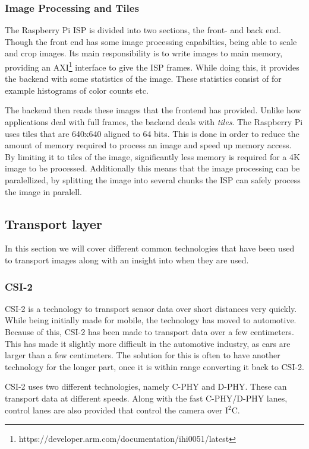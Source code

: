 \subsubsection{Image Processing and Tiles}
The Raspberry Pi ISP is divided into two sections, the front- and back end.
Though the front end has some image processing capabilties, being able to scale
and crop images. Its main responsibility is to write images to main memory,
providing an
AXI\footnote{https://developer.arm.com/documentation/ihi0051/latest} interface
to give the ISP frames. While doing this, it provides the backend with some
statistics of the image. These statistics consist of for example histograms
of color counts etc.

The backend then reads these images that the frontend has provided. Unlike how
applications deal with full frames, the backend deals with \textit{tiles}. The
Raspberry Pi uses tiles that are 640x640 aligned to 64 bits. This is done in
order to reduce the amount of memory required to process an image and speed up
memory access. By limiting it to tiles of the image, significantly less memory
is required for a 4K image to be processed. Additionally this means that the
image processing can be paralellized, by splitting the image into several
chunks the ISP can safely process the image in paralell.

\subsection{Transport layer}
In this section we will cover different common technologies that have been used
to transport images along with an insight into when they are used.

\subsubsection{CSI-2}
CSI-2 is a technology to transport sensor data over short distances very
quickly. While being initially made for mobile, the technology has moved to
automotive. Because of this, CSI-2 has been made to transport data over a few
centimeters. This has made it slightly more difficult in the automotive
industry, as cars are larger than a few centimeters. The solution for this is
often to have another technology for the longer part, once it is within range
converting it back to CSI-2.

CSI-2 uses two different technologies, namely C-PHY and D-PHY. These can
transport data at different speeds. Along with the fast C-PHY/D-PHY lanes,
control lanes are also provided that control the camera over I$^2$C.

